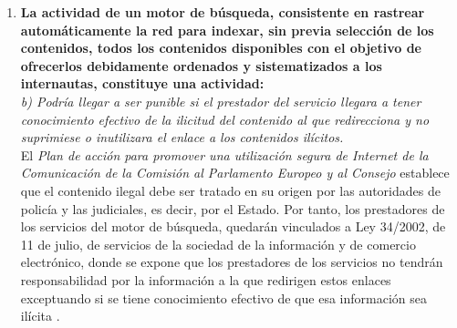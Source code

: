 \documentclass[10pt,a4paper]{article}
\begin{document}
\begin{enumerate}
\newpage

\item \textbf{La actividad de un motor de búsqueda, consistente en rastrear automáticamente la red para indexar, sin previa selección de los contenidos, todos los contenidos disponibles con el objetivo de ofrecerlos debidamente ordenados y sistematizados a los internautas, constituye una actividad:}\\
\textit{b) Podría llegar a ser punible si el prestador del servicio llegara a tener
conocimiento efectivo de la ilicitud del contenido al que redirecciona y no
suprimiese o inutilizara el enlace a los contenidos ilícitos.}\\
El \textit{Plan de acción para promover una utilización segura de Internet de la Comunicación de la Comisión al Parlamento Europeo y al Consejo} establece que el contenido ilegal debe ser tratado en su origen por las autoridades de policía y las judiciales, es decir, por el Estado. Por tanto, los prestadores de los servicios del motor de búsqueda, quedarán vinculados a Ley 34/2002, de 11 de julio, de servicios de la sociedad de la información y de comercio electrónico, donde se expone que los prestadores de los servicios no tendrán responsabilidad por la información a la que redirigen estos enlaces exceptuando si se tiene conocimiento efectivo de que esa información sea ilícita \cite[Cap. II. Sección 2. Art. 17]{society}.

\end{enumerate}
\end{document}
